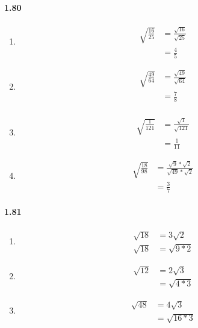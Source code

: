 \documentclass{article}
\newcommand\litem[1]{\item{\bfseries#1\space}}
\begin{document}
\paragraph{1.80}
\begin{enumerate}[label=\emph{\alph*})]
\litem{
\begin{align*}
  \sqrt{\frac{16}{25}} &= \frac{\sqrt{16}}{\sqrt{25}} \\
  &= \frac{4}{5}
\end{align*}
}
\litem{
\begin{align*}
  \sqrt{\frac{49}{64}} &= \frac{\sqrt{49}}{\sqrt{64}} \\
  &= \frac{7}{8} \\
\end{align*}
}
\litem{
\begin{align*}
  \sqrt{\frac{1}{121}} &= \frac{\sqrt{1}}{\sqrt{121}} \\
  &= \frac{1}{11}
\end{align*}
}
\litem{
\begin{align*}
  \sqrt{\frac{18}{98}} &= \frac{\sqrt{9} * \sqrt{2}}{\sqrt{49} * \sqrt{2}} \\
  &= \frac{3}{7}
\end{align*}
}
\end{enumerate}

\paragraph{1.81}
\begin{enumerate}[label=\emph{\alph*})]
\litem{
\begin{align*}
  \sqrt{18} &= 3\sqrt{2} \\
  \sqrt{18} &= \sqrt{9 * 2}
\end{align*}
}
\litem{
\begin{align*}
  \sqrt{12} &= 2\sqrt{3} \\
  &= \sqrt{4 * 3}
\end{align*}
}
\litem{
\begin{align*}
  \sqrt{48} &= 4\sqrt{3} \\
  &= \sqrt{16 * 3}
\end{align*}
}
\end{enumerate}
\end{document}

